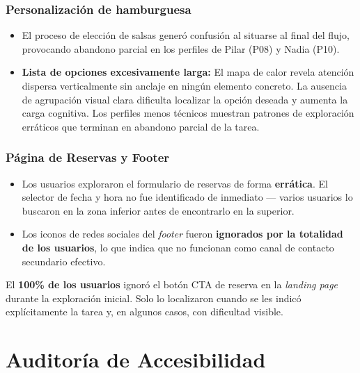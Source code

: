 \documentclass[11pt,a4paper]{article}
\begin{document}
\subsubsection{Personalización de hamburguesa}

\begin{itemize}
  \item El proceso de elección de salsas generó confusión al situarse al final del flujo,
        provocando abandono parcial en los perfiles de Pilar (P08) y Nadia (P10).
  \item \textbf{Lista de opciones excesivamente larga:} El mapa de calor revela atención
        dispersa verticalmente sin anclaje en ningún elemento concreto. La ausencia de
        agrupación visual clara dificulta localizar la opción deseada y aumenta la carga
        cognitiva. Los perfiles menos técnicos muestran patrones de exploración erráticos
        que terminan en abandono parcial de la tarea.
\end{itemize}

\subsubsection{Página de Reservas y Footer}

\begin{itemize}
  \item Los usuarios exploraron el formulario de reservas de forma \textbf{errática}.
        El selector de fecha y hora no fue identificado de inmediato — varios usuarios
        lo buscaron en la zona inferior antes de encontrarlo en la superior.
  \item Los iconos de redes sociales del \textit{footer} fueron \textbf{ignorados por la
        totalidad de los usuarios}, lo que indica que no funcionan como canal de contacto
        secundario efectivo.
\end{itemize}

\begin{keybox}
El \textbf{100\% de los usuarios} ignoró el botón CTA de reserva en la \textit{landing page}
durante la exploración inicial. Solo lo localizaron cuando se les indicó explícitamente la
tarea y, en algunos casos, con dificultad visible.
\end{keybox}

\section{Auditoría de Accesibilidad}
\end{document}
